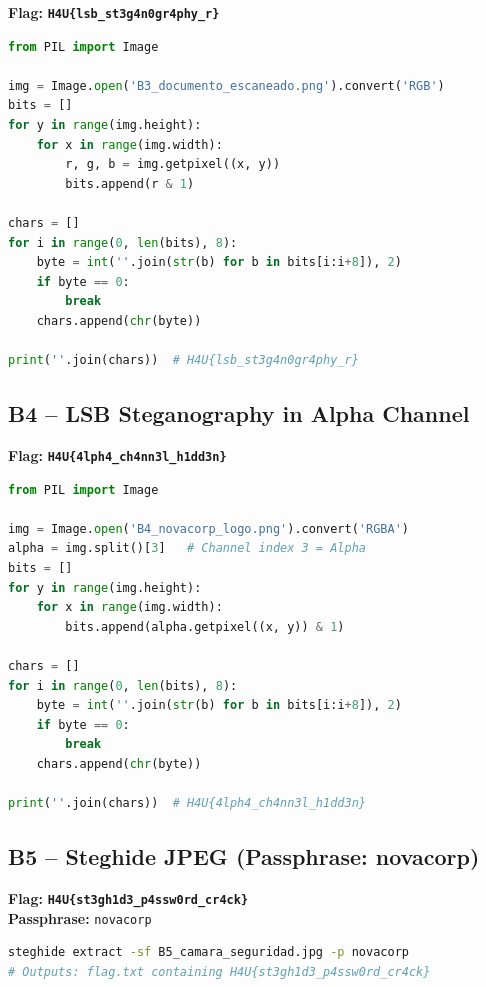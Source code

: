 \documentclass[a4paper, 12pt]{article}
\newcommand{\flag}[1]{\texttt{\color{flagcolor}\bfseries #1}}
\begin{document}
\textbf{Flag:} \flag{H4U\{lsb\_st3g4n0gr4phy\_r\}}

\begin{lstlisting}[language=python]
from PIL import Image

img = Image.open('B3_documento_escaneado.png').convert('RGB')
bits = []
for y in range(img.height):
    for x in range(img.width):
        r, g, b = img.getpixel((x, y))
        bits.append(r & 1)

chars = []
for i in range(0, len(bits), 8):
    byte = int(''.join(str(b) for b in bits[i:i+8]), 2)
    if byte == 0:
        break
    chars.append(chr(byte))

print(''.join(chars))  # H4U{lsb_st3g4n0gr4phy_r}
\end{lstlisting}

\subsection{B4 -- LSB Steganography in Alpha Channel}

\textbf{Flag:} \flag{H4U\{4lph4\_ch4nn3l\_h1dd3n\}}

\begin{lstlisting}[language=python]
from PIL import Image

img = Image.open('B4_novacorp_logo.png').convert('RGBA')
alpha = img.split()[3]   # Channel index 3 = Alpha
bits = []
for y in range(img.height):
    for x in range(img.width):
        bits.append(alpha.getpixel((x, y)) & 1)

chars = []
for i in range(0, len(bits), 8):
    byte = int(''.join(str(b) for b in bits[i:i+8]), 2)
    if byte == 0:
        break
    chars.append(chr(byte))

print(''.join(chars))  # H4U{4lph4_ch4nn3l_h1dd3n}
\end{lstlisting}

\subsection{B5 -- Steghide JPEG (Passphrase: novacorp)}

\textbf{Flag:} \flag{H4U\{st3gh1d3\_p4ssw0rd\_cr4ck\}}\\
\textbf{Passphrase:} \texttt{novacorp}

\begin{lstlisting}[language=bash]
steghide extract -sf B5_camara_seguridad.jpg -p novacorp
# Outputs: flag.txt containing H4U{st3gh1d3_p4ssw0rd_cr4ck}
\end{lstlisting}
\end{document}
